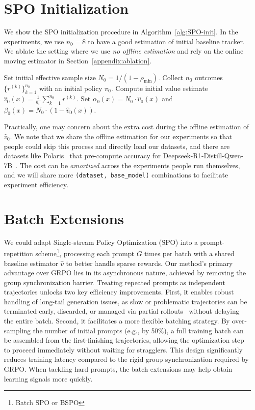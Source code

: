 \section{SPO Initialization}
We show the SPO initialization procedure in Algorithm~\ref{alg:SPO-init}.
In the experiments, we use $n_0 = 8$ to have a good estimation of initial baseline tracker. We ablate the setting where we use \emph{no offline estimation} and rely on the online moving estimator in Section~\ref{appendix:ablation}.


\begin{algorithm}[h]
\caption{SPO Initialization}
\label{alg:SPO-init} %
\begin{algorithmic}[1]
\State Set initial effective sample size $N_0 = 1 / (1 - \rho_{\min})$.
    \State Collect $n_0$ outcomes $\{r^{(k)}\}_{k=1}^{n_0}$ with an initial policy $\pi_0$.
    \State Compute initial value estimate $\hat{v}_{0}(x) = \frac{1}{n_0} \sum_{k=1}^{n_0} r^{(k)}$.
    \State Set $\alpha_0(x) = N_0 \cdot \hat{v}_{0}(x)$ and $\beta_0(x) = N_0 \cdot (1 - \hat{v}_{0}(x))$.
\EndFor
\end{algorithmic}
\end{algorithm}

Practically, one may concern about the extra cost during the offline estimation of $\hat{v}_0$. We note that we share the offline estimation for our experiments so that people could skip this process and directly load our datasets, and there are datasets like Polaris~\cite{Polaris2025} that pre-compute accuracy for Deepseek-R1-Distill-Qwen-7B~\cite{R1}. The cost can be \emph{amortized} across the experiments people run themselves, and we will share more \texttt{(dataset, base\_model)} combinations to facilitate experiment efficiency.


\section{Batch Extensions}
We could adapt Single-stream Policy Optimization (SPO) into a prompt-repetition scheme\footnote{Batch SPO or BSPO}, processing each prompt $G$ times per batch with a shared baseline estimator $\hat{v}$ to better handle sparse rewards. Our method's primary advantage over GRPO lies in its asynchronous nature, achieved by removing the group synchronization barrier. Treating repeated prompts as independent trajectories unlocks two key efficiency improvements. First, it enables robust handling of long-tail generation issues, as slow or problematic trajectories can be terminated early, discarded, or managed via partial rollouts~\cite{team2025kimi} without delaying the entire batch. Second, it facilitates a more flexible batching strategy. By over-sampling the number of initial prompts (e.g., by 50\%), a full training batch can be assembled from the first-finishing trajectories, allowing the optimization step to proceed immediately without waiting for stragglers. This design significantly reduces training latency compared to the rigid group synchronization required by GRPO. When tackling hard prompts, the batch extensions may help obtain learning signals more quickly.

